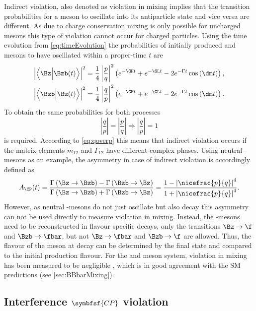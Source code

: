 Indirect \CP violation, also denoted as \CP violation in mixing implies that the transition probabilities for a meson \Paz to oscillate into its antiparticle state \Pazb and vice versa are different.
As due to charge conservation mixing is only possible for uncharged mesons this type of \CP violation cannot occur for charged particles.
Using the time evolution from \cref{eq:timeEvolution} the probabilities of \eg initially produced \Bz and \Bzb mesons to have oscillated within a proper-time $t$ are
\begin{align}
\left|\left<\Bz\Big|\Bzb\!\left(t\right)\right>\right|^2=\frac{1}{4}\left|\frac{p}{q}\right|^2
\left(e^{-\GH t}+e^{-\GL t}-2e^{-\Gamma t}\cos\left(\dm t\right)\right),\\
\left|\left<\Bzb\Big|\Bz\!\left(t\right)\right>\right|^2=\frac{1}{4}\left|\frac{q}{p}\right|^2
\left(e^{-\GH t}+e^{-\GL t}-2e^{-\Gamma t}\cos\left(\dm t\right)\right).
\end{align}
To obtain the same probabilities for both processes
\begin{equation}
\left|\frac{q}{p}\right|=\left|\frac{p}{q}\right| \Rightarrow \left|\frac{q}{p}\right|=1
\end{equation}
is required.
According to \cref{eq:qoverp} this means that indirect \CP violation occurs if the matrix elements $m_{12}$ and $\Gamma_{12}$ have different complex phases.
Using neutral \B-mesons as an example, the \CP asymmetry in case of indirect \CP violation is accordingly defined as
\begin{equation}
A_{\CP}(t)=\frac{\Gamma\left(\Bz\to\Bzb\right) - \Gamma\left(\Bzb\to\Bz\right)}{\Gamma\left(\Bz\to\Bzb\right) + \Gamma\left(\Bzb\to\Bz\right)}
= \frac{1-\left|\nicefrac{p}{q}\right|^4}{1+\left|\nicefrac{p}{q}\right|^4}.
\end{equation}
However, as neutral \B-mesons do not just oscillate but also decay this asymmetry can not be used directly to measure \CP violation in mixing.
Instead, the \B-mesons need to be reconstructed in flavour specific decays, \ie only the transitions $\Bz\to\f$ and $\Bzb\to\fbar$, but not $\Bz\to\fbar$ and $\Bzb\to\f$ are allowed.
Thus, the flavour of the meson at decay can be determined by the final state and compared to the initial production flavour.
For the \Bz and \Bs meson system, \CP violation in mixing has been measured to be negligible \cite{HFLAV2016}, which is in good agreement with the \ac{SM} predictions (see \cref{sec:BBbarMixing}).

\subsection[head={Interference \CP violation},tocentry={Interference \CP violation}]{Interference $\symbfsf{C{}P}$ violation}
\label{sec:InterferenceCPV}

